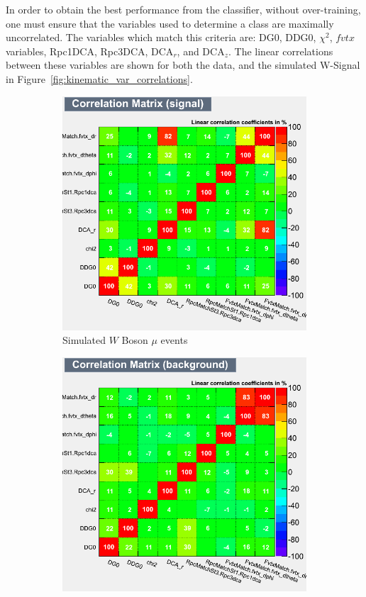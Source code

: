 In order to obtain the best performance from the classifier, without
over-training, one must ensure that the variables used to determine a class are
maximally uncorrelated. The variables which match this criteria are: DG0, DDG0,
$\chi^2$, $fvtx$ variables, Rpc1DCA, Rpc3DCA, DCA$_r$, and DCA$_z$. The linear
correlations between these variables are shown for both the data, and the
simulated W-Signal in Figure~\ref{fig:kinematic_var_correlations}.

\begin{figure}[H]
	\centering
	\begin{subfigure}[t]{0.5\textwidth}
		\centering
		\includegraphics[width=0.95\linewidth]{./figures/CorrelationMatrix_Signal.png}
		\caption{
      Simulated $W$ Boson $\mu$ events
    }
		\label{fig:corr_mat_sig}
	\end{subfigure}%
  \begin{subfigure}[t]{0.5\textwidth}
		\centering
		\includegraphics[width=0.95\linewidth]{./figures/CorrelationMatrix_Background.png}

\end{subfigure}
\end{figure}
